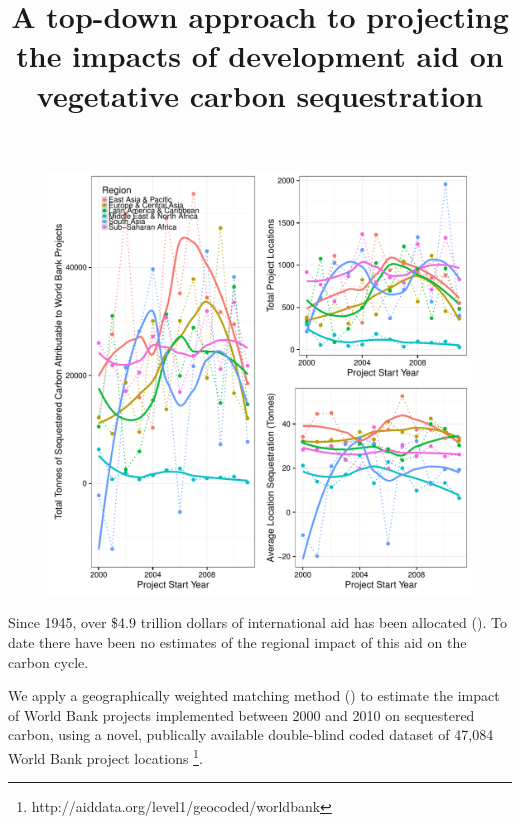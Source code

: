 \documentclass{article}\usepackage[]{graphicx}\usepackage[]{color}
\title{A top-down approach to projecting the impacts of development aid on vegetative carbon sequestration}
\makeatletter
\def\maxwidth{ %
  \ifdim\Gin@nat@width>\linewidth
    \linewidth
  \else
    \Gin@nat@width
  \fi
}
\newenvironment{knitrout}{}{}  %
\newcommand\gobblepars{%
    \@ifnextchar\par%
        {\expandafter\gobblepars\@gobble}%
        {}}
\makeatother
\begin{document}
\begin{knitrout}


\maketitle






\begin{figure}\centering
\begin{Schunk}

\includegraphics[width=\maxwidth]{figure/Fig1-1} \end{Schunk}
\end{figure}  


  Since 1945, over \$4.9 trillion dollars of international aid has been allocated (\cite{tierney_more_2011}).
 To date there have been no estimates of the regional impact of this aid on the carbon cycle. \gobblepars

We apply a geographically weighted matching method (\cite{andam_measuring_2008}) to estimate the impact of World Bank projects implemented between 2000 and 2010 on sequestered carbon, using a novel, publically available double-blind coded dataset of 47,084 World Bank project locations \footnote{http://aiddata.org/level1/geocoded/worldbank}. \gobblepars


\end{knitrout}
\end{document}
